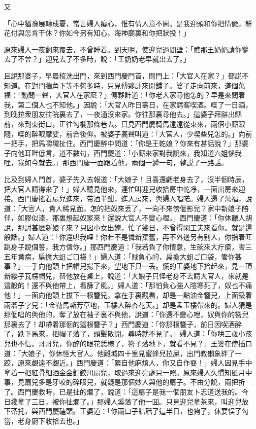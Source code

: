 又
\begin{myquote}
「心中猶豫展轉成憂，常言婦人癡心，惟有情人意不周。是我迎頭和你把情偸，鮮花付與怎肯干休？你如今另有知心，海神廟裏和你把狀投！」
\end{myquote}

原來婦人一夜翻來覆去，不曾睡着。到天明，使迎兒過間壁：「瞧那王奶奶請你爹去了不曾？」迎兒去了不多時，說：「王奶奶老早就出去了。」

且說那婆子，早晨梳洗出門，來到西門慶門首，問門上：「大官人在家？」都説不知道。在對門牆角下等不夠多時，只見傅夥計來開舖子。婆子走向前來，道個萬福：「動問一聲，大官人在家麽？」傅夥計道：「你老人家尋他怎的？早是來問着我，第二個人也不知他。」因說：「大官人昨日壽日，在家請客喫酒。喫了一日酒，到晚拉衆朋友往院裏去了，一夜通沒來家。你往那裏尋他去。」這婆子拜辭出縣前，來到東街口，正往勾欄那條巷去。只見西門慶騎馬遠遠從東來，兩個小廝跟隨，喫的醉眼摩娑，前合後仰。被婆子高聲叫道：「大官人，少喫些兒怎的。」向前一把手，把馬嚼環扯住。西門慶醉中問道：「你是王乾娘？你來有甚話說？」那婆子向他耳畔低言，道不數句，西門慶道：「小廝來家對我說來，我知道六姐惱我哩，我如今就去。」那西門慶一面跟着他，兩個一遞一句，整説了一路話。

比及到婦人門首，婆子先入去報道：「大娘子！且喜還虧老身去了，沒半個時辰，把大官人請得來了！」婦人聽見他來，連忙叫迎兒收拾房中乾凈，一面出房來迎接。西門慶搖着扇兒進來，带酒半酣，進入房來，與婦人唱喏。婦人還了萬福，說道：「大官人，貴人稀見面，怎的把奴來丢了，一向不來傍個影兒？家中新娘子陪伴，如膠似漆，那裏想起奴家來！還説大官人不變心哩。」西門慶道：「你休聽人胡說，那討甚麽新娘子來？只因小女出嫁，忙了幾日，不曾得閑工夫來看你。就是這般話。」婦人道：「你還哄我哩！你若不是憐新棄舊，再不外邊另有别人，你指着旺跳身子說個誓，我方信你。」那西門慶道：「我若負了你情意，生碗來大疔瘡，害三五年黄病，扁擔大蛆ご口袋！」婦人道：「賊負心的，扁擔大蛆ご口袋，管你甚事？」一手向他頭上把帽兒撮下來，望地下只一丢。慌的王婆地下拾起來，見一頂新纓子瓦楞帽兒，替他放在桌上，說道：「大娘子只怪老身不去請大官人，來就是這般的！還不與他帶上，看篩了風。」婦人道：「那怕負心強人陰寒死了，奴也不痛他！」一面向他頭上拔下一根簪兒，拿在手裏觀看，却是一點油金簪兒，上面鈒着兩溜子字兒：「金勒馬嘶芳草地，玉樓人醉杏花天。」却是孟玉樓帶來的。婦人猜是那個唱的與他的，奪了放在袖子裏不與他，說道：「你還不變心哩，奴與你的簪兒那裏去了！却帶着那個的這根簪子？」西門慶道：「你那根簪子，前日因喫酒醉了，跌下馬來，把帽子落了，頭髮散開，尋時就不見了。」婦人道：「你哄三歲小孩兒也不信。哥哥兒，你醉的眼花恁様了，簪子落地下，就看不見？」王婆在傍插口道：「大娘子，你休怪大官人。他離城四十里見蜜蜂兒拉屎，出門教獺象絆了一跤，原來覷遠不覷近。」西門慶道：「緊自他麻煩人，你又自作耍！」婦人因見手中拿着一把紅骨細洒金金釘鉸川扇兒，取過來迎亮處只一照。原來婦人久慣知風月中事，見扇兒多是牙咬的碎眼兒，就疑是那個妙人與他的扇子。不由分說，兩把折了。西門慶救時，已是扯的爛了，說道：「這扇子是我一個朋友卜志道送我的。今日纔拿了三日，被你扯爛了。」那婦人奚落了他一囬。只見迎兒拿茶來，叫迎兒放下茶托，與西門慶磕頭。王婆道：「你兩口子聐聒了這半日，也夠了，休要悮了勾當，老身廚下收拾去也。」

